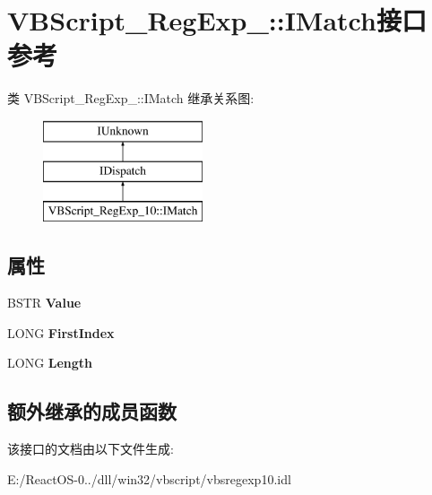 \hypertarget{interface_v_b_script___reg_exp__10_1_1_i_match}{}\section{V\+B\+Script\+\_\+\+Reg\+Exp\+\_\+:\+:I\+Match接口 参考}
\label{interface_v_b_script___reg_exp__10_1_1_i_match}
类 V\+B\+Script\+\_\+\+Reg\+Exp\+\_\+:\+:I\+Match 继承关系图\+:\begin{figure}[H]
\begin{center}
\leavevmode
\includegraphics[height=3.000000cm]{interface_v_b_script___reg_exp__10_1_1_i_match}
\end{center}
\end{figure}
\subsection*{属性}
\begin{DoxyCompactItemize}
\item 
\mbox{\label{interface_v_b_script___reg_exp__10_1_1_i_match_a7a70990eaf6fdeeb8bacec92478151d7}} 
B\+S\+TR {\bfseries Value}
\item 
\mbox{\label{interface_v_b_script___reg_exp__10_1_1_i_match_a8345e44f7b08254347a5122345071142}} 
L\+O\+NG {\bfseries First\+Index}
\item 
\mbox{\label{interface_v_b_script___reg_exp__10_1_1_i_match_a5f3ca8d6c7074f5d5d5b3529276891fd}} 
L\+O\+NG {\bfseries Length}
\end{DoxyCompactItemize}
\subsection*{额外继承的成员函数}


该接口的文档由以下文件生成\+:\begin{DoxyCompactItemize}
\item 
E\+:/\+React\+O\+S-\/0../dll/win32/vbscript/vbsregexp10.\+idl\end{DoxyCompactItemize}
